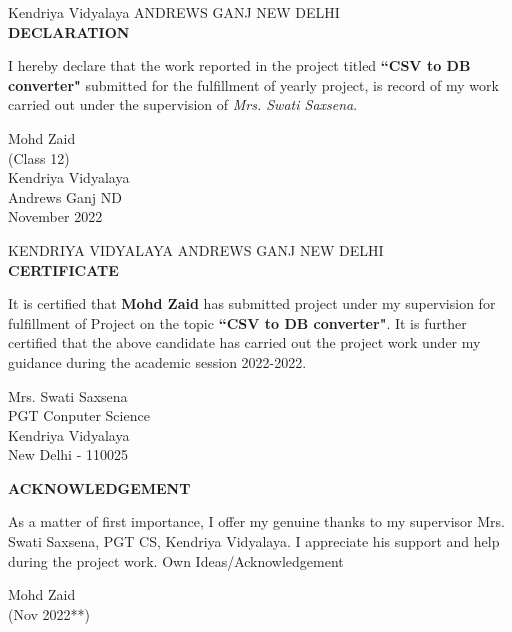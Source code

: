 \documentclass[12pt,a4paper]{report}
\begin{document}
\begin{titlepage}
{\newpage

    Kendriya Vidyalaya ANDREWS GANJ NEW DELHI\\
    \vspace{1cm}
    {\LARGE \textbf{DECLARATION}}\\}
    \vspace{1cm}
    I hereby declare that the work reported in the project titled \textbf{``CSV to DB converter"} submitted for the fulfillment of yearly project, is record of my work carried out under the supervision of \textit{Mrs. Swati Saxsena}.
    
    \vspace{3cm}
    \begin{flushright}
        {\Large Mohd Zaid}\\(Class 12)\\
        Kendriya Vidyalaya\\Andrews Ganj ND\\November 2022
    \end{flushright}	

\newpage
    {\centering KENDRIYA VIDYALAYA ANDREWS GANJ NEW DELHI\\ 
    \vspace{1cm}
    {\Large \textbf{CERTIFICATE}}\\}
    \vspace{.50cm}		
		
    It is certified that \textbf{Mohd Zaid} has submitted project under my supervision for fulfillment of Project on the topic \textbf{``CSV to DB converter"}. It is further certified that the above candidate has carried out the project work under my guidance during the academic session 2022-2022.
    
    \vspace{2cm}
    \begin{flushright}
        {\Large {Mrs. Swati Saxsena}}\\
        PGT Conputer Science\\Kendriya Vidyalaya\\New Delhi - 110025
    \end{flushright}
		
\newpage
    \begin{center}
        {\LARGE \textbf{ACKNOWLEDGEMENT}}\\
    \end{center}
    \vspace{1cm}
    As a matter of first importance, I offer my genuine thanks to my supervisor Mrs. Swati Saxsena, PGT CS, Kendriya Vidyalaya. I appreciate his support and help during the project work. Own Ideas/Acknowledgement\\
    \vspace{1cm}
    
    \begin{flushright}
        {\large Mohd Zaid}\\(Nov 2022**)\\
    \end{flushright}

\end{titlepage}
\end{document}
